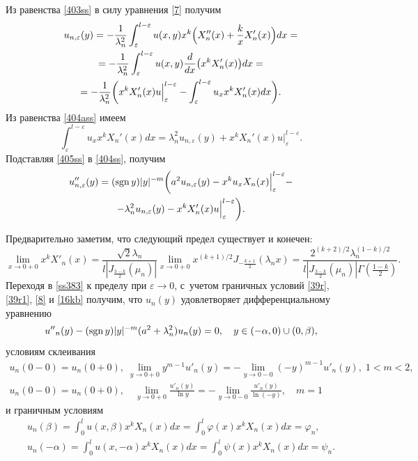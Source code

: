 Из равенства \eqref{403ss} в силу уравнения \eqref{7} получим
\begin{multline}
\label{404ass}
u_{n,\varepsilon}(y)=-\frac{1}{\lambda_{n}^{2}} \int _{\varepsilon}^{l-\varepsilon}u(x,y)x^{k}
\Bigl(X_{n}''(x)+\frac{k}{x}X_{n}'(x)\Bigr)dx=
\\
=-\frac{1}{\lambda_{n}^{2}} \int _{\varepsilon}^{l-\varepsilon}u(x,y)\frac{d}{dx} \bigl(x^{k}X_{n}'(x)\bigr)dx=
\\
=-\frac{1}{\lambda_{n}^{2}}
\biggl(x^{k}X_{n}'(x)u\Big|_{\varepsilon}^{l-\varepsilon}- \int _{\varepsilon}^{l-\varepsilon}u_{x}x^{k}X_{n}'(x)dx\biggr).
\end{multline}
Из равенства \eqref{404ass} имеем
\begin{equation}
\label{405ss}
 \int _{\varepsilon}^{l-\varepsilon}u_{x}x^{k}X_{n}'(x)dx=\lambda_{n}^{2}u_{n,\varepsilon}(y)+x^{k}X_{n}'(x)u\Big|_{\varepsilon}^{l-\varepsilon}.
\end{equation}
Подставляя \eqref{405ss} в \eqref{404ss}, получим
\begin{multline}\label{ss383}
u_{n,\varepsilon}''(y)=(\mathop{\rm sgn}y)|y|^{-m}
\biggl( a^{2}u_{n,\varepsilon}(y)-x^{k}u_{x}X_{n}(x)\Big|_{\varepsilon}^{l-\varepsilon} -
\\ 
-\lambda_{n}^{2}u_{n,\varepsilon}(y)-x^{k}X_{n}'(x)u\Big|_{\varepsilon}^{l-\varepsilon}\biggr).
\end{multline}

Предварительно заметим, что следующий предел существует и конечен:
$$
\lim\limits_{x\rightarrow 0+0}x^{k}X'_{n}(x)=
\frac{\sqrt 2 \lambda_n }{l | J_{\frac{3-k}{2}} (\mu_n) | }
\lim\limits_{x\rightarrow 
0+0}x^{({k+1})/{2}}J_{-\frac{k+1}{2}}(\lambda_{n}x)=
\frac{2^{(k+2)/2} \lambda_n ^{(1-k)/2} }{l | J_{\frac{3-k}{2}} (\mu_n) |  \Gamma (\frac{1-k}{2}) }.
$$
Переходя в \eqref{ss383} к пределу при $\varepsilon\rightarrow 0$, с~учетом граничных условий \eqref{39r},  \eqref{39r1}, \eqref{8} и \eqref{16kb} получим, что $u_{n}(y)$ удовлетворяет
дифференциальному уравнению
\begin{equation}
\label{406ss}
u{''}_{n}(y)-(\mathop{\rm sgn}y)|y|^{-m}(a^{2}+\lambda_{n}^{2})u_{n}(y)=0,
 \quad  y\in (-\alpha, 0)\cup (0, \beta),
\end{equation}
условиям склеивания
\begin{gather} \label{13ss1}
 u_{n}(0-0)=u_{n}(0+0), \;
\lim\limits_{y\rightarrow
0+0}y^{m-1}u'_{n}(y)=-\lim\limits_{y\rightarrow
0-0}(-y)^{m-1}u'_{n}(y), \; 1<m<2, 
\\
\label{13ss2}
u_{n}(0-0)=u_{n}(0+0), \quad  \lim\limits_{y\rightarrow
0+0}\frac{u'_{n}(y)}{\ln y}= -\lim\limits_{y\rightarrow
0-0}\frac{u'_{n}(y)}{\ln (-y)},\quad  m=1
\end{gather}
и граничным условиям
\begin{gather} \label{23ss1}
u_{n}(\beta)= \int _{0}^{l}u(x,\beta)x^{k}X_{n}(x)dx= \int _{0}^{l}\varphi(x)x^{k}X_{n}(x)dx=\varphi_{n},
\\
 \label{24ss1}
u_{n}(-\alpha)= \int _{0}^{l}u(x,-\alpha)x^{k}X_{n}(x)dx= \int _{0}^{l}\psi(x)x^{k}X_{n}(x)dx=\psi_{n}.
\end{gather}

